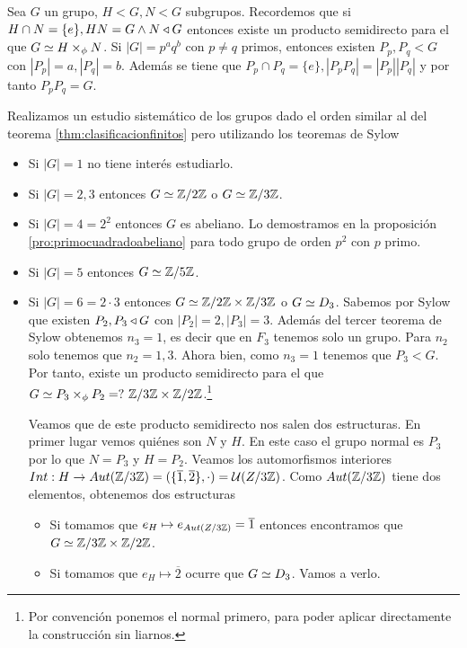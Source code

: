 \begin{ej}
	\label{ej:clasificacionsylow}
	Sea $G$ un grupo, $H < G, N < G$ subgrupos. Recordemos que si $H\cap N = \{e\}, HN = G \land N \mathbin{\triangleleft} G$ entonces existe un producto semidirecto para el que $G \simeq H \times_\phi N$. Si $|G| = p^a q^b$ con $p \neq q$ primos, entonces existen $P_p, P_q < G$ con $|P_p| = a, |P_q| = b$. Además se tiene que $P_p \cap P_q = \{e\}, |P_pP_q| = |P_p||P_q|$ y por tanto $P_pP_q = G$.
	
	Realizamos un estudio sistemático de los grupos dado el orden similar al del teorema \ref{thm:clasificacionfinitos} pero utilizando los teoremas de Sylow
	\begin{itemize}
		\item Si $|G| = 1$ no tiene interés estudiarlo.
		\item Si $|G| = 2, 3$ entonces $G \simeq \mathbb{Z}/2\mathbb{Z}$ o $G\simeq \mathbb{Z}/3\mathbb{Z}$.
		\item Si $|G| = 4 = 2^2$ entonces $G$ es abeliano. Lo demostramos en la proposición \ref{pro:primocuadradoabeliano} para todo grupo de orden $p^2$ con $p$ primo.
		\item Si $|G| = 5$ entonces $G \simeq \mathbb{Z}/5\mathbb{Z}$.
		\item Si $|G| = 6 = 2\cdot 3$ entonces $G \simeq \mathbb{Z}/2\mathbb{Z} \times \mathbb{Z}/3\mathbb{Z}$ o $G \simeq D_3$. Sabemos por Sylow que existen $P_2, P_3 \mathbin{\triangleleft} G$ con $|P_2| = 2, |P_3| = 3$. Además del tercer teorema de Sylow obtenemos $n_3 = 1$, es decir que en $F_3$ tenemos solo un grupo. Para $n_2$ solo tenemos que $n_2 = 1, 3$. Ahora bien, como $n_3 = 1$ tenemos que $P_3 < G$. Por tanto, existe un producto semidirecto para el que $G \simeq P_3 \times_\phi P_2  =?\ \mathbb{Z}/3\mathbb{Z} \times \mathbb{Z}/2\mathbb{Z}$.\footnote{Por convención ponemos el normal primero, para poder aplicar directamente la construcción sin liarnos.}
		
		Veamos que de este producto semidirecto nos salen dos estructuras. En primer lugar vemos quiénes son $N$ y $H$. En este caso el grupo normal es $P_3$ por lo que $N = P_3$ y $H = P_2$. Veamos los automorfismos interiores $Int:H \to Aut(\mathbb{Z}/3\mathbb{Z}) = (\{\overline{1}, \overline{2}\}, \cdot) = \mathcal{U}(Z/3\mathbb{Z})$. Como $Aut(\mathbb{Z}/3\mathbb{Z})$ tiene dos elementos, obtenemos dos estructuras
		\begin{itemize}
			\item Si tomamos que $e_H \mapsto e_{Aut(Z/3\mathbb{Z})} = \overline{1}$ entonces encontramos que $G \simeq \mathbb{Z}/3\mathbb{Z} \times \mathbb{Z}/2\mathbb{Z}$.
			\item Si tomamos que $e_H \mapsto \overline{2}$ ocurre que $G \simeq D_3$. Vamos a verlo.
			

\end{itemize}
\end{itemize}
\end{ej}
